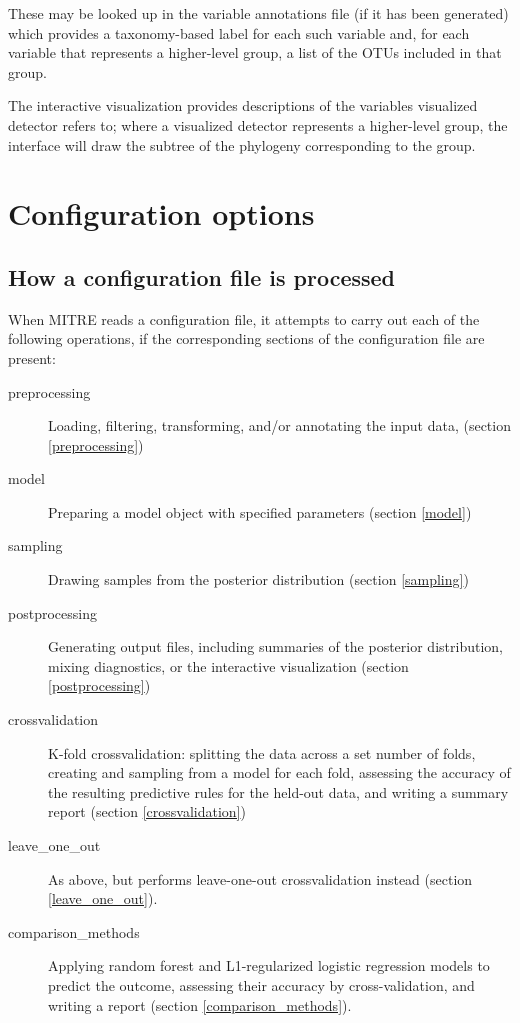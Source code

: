 \documentclass[12pt]{report}
\begin{document}
These may be looked up in the variable annotations file (if it has
been generated) which provides a taxonomy-based label for each such
variable and, for each variable that represents a higher-level group,
a list of the OTUs included in that group.

The interactive visualization provides descriptions of the variables
visualized detector refers to; where a visualized detector represents
a higher-level group, the interface will draw the subtree of the
phylogeny corresponding to the group.

\chapter{Configuration options}\label{configuration}
\section{How a configuration file is processed}
When MITRE reads a configuration file, it attempts
to carry out each of the following operations, if the
corresponding sections of the configuration file are present:

\begin{description}
\item[preprocessing] Loading, filtering, transforming, and/or
  annotating the input data, (section \ref{preprocessing})
\item[model] Preparing a model object with specified
  parameters (section \ref{model})
\item[sampling] Drawing samples from the posterior distribution (section
  \ref{sampling})
\item[postprocessing] Generating output files, including summaries of
  the posterior distribution, mixing diagnostics, or the interactive
  visualization (section \ref{postprocessing})
\item[crossvalidation] K-fold crossvalidation: splitting the data
  across a set number of folds, creating and sampling from a model for
  each fold, assessing the accuracy of the resulting predictive rules
  for the held-out data, and writing a summary report (section \ref{crossvalidation})
\item[leave\_one\_out] As above, but performs leave-one-out
  crossvalidation instead (section \ref{leave_one_out}).
\item[comparison\_methods] Applying random forest and L1-regularized
  logistic regression models to predict the outcome, assessing their
  accuracy by cross-validation, and writing a report (section
  \ref{comparison_methods}).
\end{description}
\end{document}
